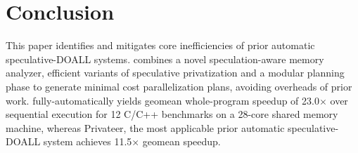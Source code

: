 \section{Conclusion}

This paper identifies and mitigates core inefficiencies of prior
automatic speculative-DOALL systems. \name combines a novel
speculation-aware memory analyzer, efficient variants of speculative
privatization and a modular planning phase to generate minimal cost
parallelization plans, avoiding overheads of prior work.
%
\name fully-automatically yields geomean whole-program speedup of
23.0$\times$ over sequential execution for 12 C/C++ benchmarks on a
28-core shared memory machine, whereas Privateer, the most applicable
prior automatic speculative-DOALL system achieves 11.5$\times$ geomean
speedup.

